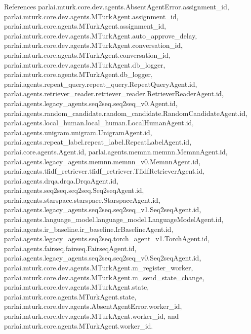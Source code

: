 References parlai.\+mturk.\+core.\+dev.\+agents.\+Absent\+Agent\+Error.\+assignment\+\_\+id, parlai.\+mturk.\+core.\+dev.\+agents.\+M\+Turk\+Agent.\+assignment\+\_\+id, parlai.\+mturk.\+core.\+agents.\+M\+Turk\+Agent.\+assignment\+\_\+id, parlai.\+mturk.\+core.\+dev.\+agents.\+M\+Turk\+Agent.\+auto\+\_\+approve\+\_\+delay, parlai.\+mturk.\+core.\+dev.\+agents.\+M\+Turk\+Agent.\+conversation\+\_\+id, parlai.\+mturk.\+core.\+agents.\+M\+Turk\+Agent.\+conversation\+\_\+id, parlai.\+mturk.\+core.\+dev.\+agents.\+M\+Turk\+Agent.\+db\+\_\+logger, parlai.\+mturk.\+core.\+agents.\+M\+Turk\+Agent.\+db\+\_\+logger, parlai.\+agents.\+repeat\+\_\+query.\+repeat\+\_\+query.\+Repeat\+Query\+Agent.\+id, parlai.\+agents.\+retriever\+\_\+reader.\+retriever\+\_\+reader.\+Retriever\+Reader\+Agent.\+id, parlai.\+agents.\+legacy\+\_\+agents.\+seq2seq.\+seq2seq\+\_\+v0.\+Agent.\+id, parlai.\+agents.\+random\+\_\+candidate.\+random\+\_\+candidate.\+Random\+Candidate\+Agent.\+id, parlai.\+agents.\+local\+\_\+human.\+local\+\_\+human.\+Local\+Human\+Agent.\+id, parlai.\+agents.\+unigram.\+unigram.\+Unigram\+Agent.\+id, parlai.\+agents.\+repeat\+\_\+label.\+repeat\+\_\+label.\+Repeat\+Label\+Agent.\+id, parlai.\+core.\+agents.\+Agent.\+id, parlai.\+agents.\+memnn.\+memnn.\+Memnn\+Agent.\+id, parlai.\+agents.\+legacy\+\_\+agents.\+memnn.\+memnn\+\_\+v0.\+Memnn\+Agent.\+id, parlai.\+agents.\+tfidf\+\_\+retriever.\+tfidf\+\_\+retriever.\+Tfidf\+Retriever\+Agent.\+id, parlai.\+agents.\+drqa.\+drqa.\+Drqa\+Agent.\+id, parlai.\+agents.\+seq2seq.\+seq2seq.\+Seq2seq\+Agent.\+id, parlai.\+agents.\+starspace.\+starspace.\+Starspace\+Agent.\+id, parlai.\+agents.\+legacy\+\_\+agents.\+seq2seq.\+seq2seq\+\_\+v1.\+Seq2seq\+Agent.\+id, parlai.\+agents.\+language\+\_\+model.\+language\+\_\+model.\+Language\+Model\+Agent.\+id, parlai.\+agents.\+ir\+\_\+baseline.\+ir\+\_\+baseline.\+Ir\+Baseline\+Agent.\+id, parlai.\+agents.\+legacy\+\_\+agents.\+seq2seq.\+torch\+\_\+agent\+\_\+v1.\+Torch\+Agent.\+id, parlai.\+agents.\+fairseq.\+fairseq.\+Fairseq\+Agent.\+id, parlai.\+agents.\+legacy\+\_\+agents.\+seq2seq.\+seq2seq\+\_\+v0.\+Seq2seq\+Agent.\+id, parlai.\+mturk.\+core.\+dev.\+agents.\+M\+Turk\+Agent.\+m\+\_\+register\+\_\+worker, parlai.\+mturk.\+core.\+dev.\+agents.\+M\+Turk\+Agent.\+m\+\_\+send\+\_\+state\+\_\+change, parlai.\+mturk.\+core.\+dev.\+agents.\+M\+Turk\+Agent.\+state, parlai.\+mturk.\+core.\+agents.\+M\+Turk\+Agent.\+state, parlai.\+mturk.\+core.\+dev.\+agents.\+Absent\+Agent\+Error.\+worker\+\_\+id, parlai.\+mturk.\+core.\+dev.\+agents.\+M\+Turk\+Agent.\+worker\+\_\+id, and parlai.\+mturk.\+core.\+agents.\+M\+Turk\+Agent.\+worker\+\_\+id.



